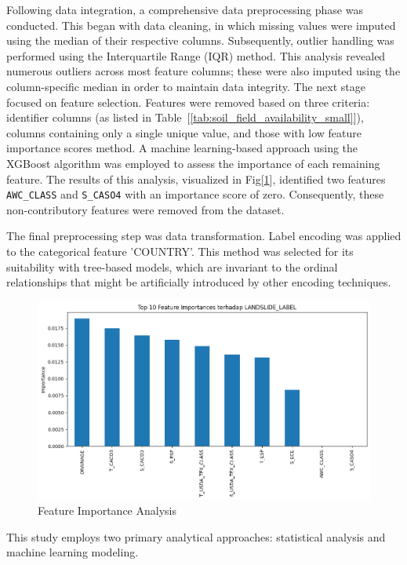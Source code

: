 Following data integration, a comprehensive data preprocessing phase was conducted. This began with data cleaning, in which missing values were imputed using the median of their respective columns. Subsequently, outlier handling was performed using the Interquartile Range (IQR) method\cite{mthd01}. This analysis revealed numerous outliers across most feature columns; these were also imputed using the column-specific median in order to maintain data integrity.
The next stage focused on feature selection. Features were removed based on three criteria: identifier columns (as listed in Table~[\ref{tab:soil_field_availability_small}]), columns containing only a single unique value, and those with low feature importance scores method. A machine learning-based approach using the XGBoost algorithm was employed to assess the importance of each remaining feature\cite{mthd02}. The results of this analysis, visualized in Fig[\ref{fig:feature-importance}], identified two features \texttt{AWC\_CLASS} and \texttt{S\_CASO4} with an importance score of zero. Consequently, these non-contributory features were removed from the dataset.

The final preprocessing step was data transformation. Label encoding was applied to the categorical feature 'COUNTRY'. This method was selected for its suitability with tree-based models, which are invariant to the ordinal relationships that might be artificially introduced by other encoding techniques\cite{mthd03}. 
\begin{figure}[htbp]
    \centerline{\includegraphics[width=\linewidth]{fig4.png}}
    \caption{Feature Importance Analysis}
    \label{fig:feature-importance}
\end{figure}
This study employs two primary analytical approaches: statistical analysis and machine learning modeling.


